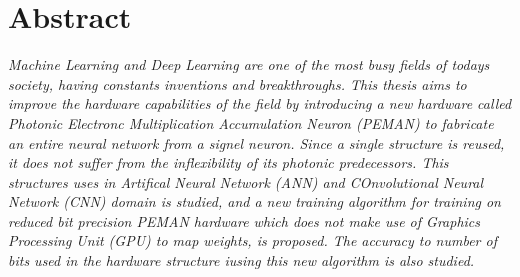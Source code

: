 \newpage
\chapter*{\centering Abstract}
\textit{\quad
	Machine Learning and Deep Learning are one of the most busy fields of todays society, having constants inventions and breakthroughs. This thesis aims to improve the hardware capabilities of the field by introducing a new hardware called Photonic Electronc Multiplication Accumulation Neuron (PEMAN) to fabricate an entire neural network from a signel neuron. Since a single structure is reused, it does not suffer from the inflexibility of its photonic predecessors. This structures uses in Artifical Neural Network (ANN) and COnvolutional Neural Network (CNN) domain is studied, and a new training algorithm for training on reduced bit precision PEMAN hardware which does not make use of Graphics Processing Unit (GPU) to map weights, is proposed. The accuracy to number of bits used in the hardware structure iusing this new algorithm is also studied.
}

